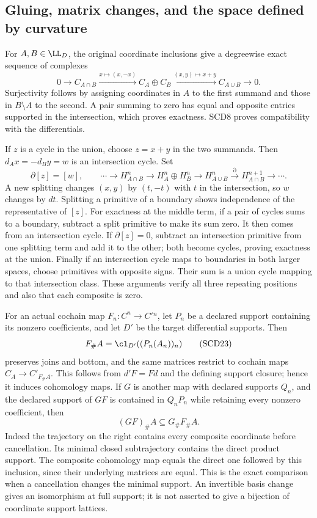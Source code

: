 \documentclass[11pt,a4paper]{article}
\theoremstyle{definition}\newtheorem{definition}[theorem]{Definition}
\begin{document}
\subsection{Gluing, matrix changes, and the space defined by curvature}

For \(A,B\in\LL_D\), the original coordinate inclusions give
a degreewise exact sequence of complexes
\[
 0\to C_{A\cap B}\xrightarrow{x\mapsto(x,-x)}
 C_A\oplus C_B\xrightarrow{(x,y)\mapsto x+y}C_{A\cup B}\to0 .
 \tag{SCD21}
\]
Surjectivity follows by assigning coordinates in \(A\) to the first
summand and those in \(B\setminus A\) to the second. A pair summing
to zero has equal and opposite entries supported in the intersection,
which proves exactness. SCD8 proves compatibility with the differentials.

If \(z\) is a cycle in the union, choose \(z=x+y\) in the two
summands. Then \(d_Ax=-d_By=w\) is an intersection cycle. Set
\[
 \partial[z]=[w],\qquad
 \cdots\to H_{A\cap B}^n\to H_A^n\oplus H_B^n
 \to H_{A\cup B}^n\xrightarrow{\partial}H_{A\cap B}^{n+1}\to\cdots .
 \tag{SCD22}
\]
A new splitting changes \((x,y)\) by \((t,-t)\) with \(t\) in
the intersection, so \(w\) changes by \(dt\). Splitting a primitive
of a boundary shows independence of the representative of \([z]\).
For exactness at the middle term, if a pair of cycles sums to a
boundary, subtract a split primitive to make its sum zero. It then
comes from an intersection cycle. If \(\partial[z]=0\), subtract
an intersection primitive from one splitting term and add it to
the other; both become cycles, proving exactness at the union.
Finally if an intersection cycle maps to boundaries in both larger
spaces, choose primitives with opposite signs. Their sum is a union
cycle mapping to that intersection class. These arguments verify
all three repeating positions and also that each composite is zero.

For an actual cochain map \(F_n:C^n\to C'{}^n\), let \(P_n\)
be a declared support containing its nonzero coefficients, and
let \(D'\) be the target differential supports. Then
\[
 F_\#A=\cl_{D'}((P_n(A_n))_n)
 \tag{SCD23}
\]
preserves joins and bottom, and the same matrices restrict to
cochain maps \(C_A\to C'_{F_\#A}\). This follows from \(d'F=Fd\)
and the defining support closure; hence it induces cohomology maps.
If \(G\) is another map with declared supports \(Q_n\), and the
declared support of \(GF\) is contained in \(Q_nP_n\) while retaining
every nonzero coefficient, then
\[
 (GF)_\#A\subseteq G_\#F_\#A .
 \tag{SCD24}
\]
Indeed the trajectory on the right contains every composite
coordinate before cancellation. Its minimal closed subtrajectory
contains the direct product support. The composite cohomology map
equals the direct one followed by this inclusion, since their
underlying matrices are equal. This is the exact comparison when
a cancellation changes the minimal support. An invertible basis
change gives an isomorphism at full support; it is not asserted
to give a bijection of coordinate support lattices.
\end{document}

